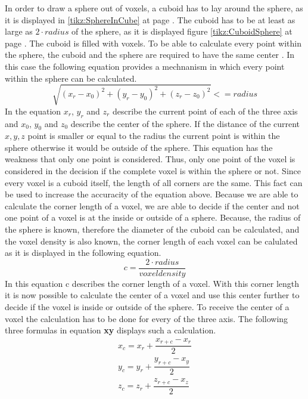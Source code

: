 In order to draw a sphere out of voxels, a cuboid has to lay around the sphere, as it is displayed in \ref{tikz:SphereInCube} at page \pageref{tikz:SphereInCube}. The cuboid has to be at least as large as $2 \cdot radius$ of the sphere, as it is displayed figure \ref{tikz:CuboidSphere} at page \pageref{tikz:CuboidSphere}. The cuboid is filled with voxels. To be able to calculate every point within the sphere, the cuboid and the sphere are required to have the same center \cite{REF}. In this case the following equation provides a mechnanism in which every point within the sphere can be calculated.
\begin{equation}
\sqrt{(x_{r}-x_{0})^2 + (y_{r}-y_{0})^2 + (z_{r}-z_{0})^2} <= radius
\end{equation}
In the equation $x_{r}$, $y_{r}$ and $z_{r}$ describe the current point of each of the three axis and $x_{0}$, $y_{0}$ and $z_{0}$ describe the center of the sphere. If the distance of the current $x, y, z$ point is smaller or equal to the radius the current point is within the sphere otherwise it would be outside of the sphere.
This equation has the weakness that only one point is considered. Thus, only one point of the voxel is considered in the decision if the complete voxel is within the sphere or not.
Since every voxel is a cuboid itself, the length of all corners are the same. This fact can be used to increase the accuracity of the equation above. Because we are able to calculate the corner length of a voxel, we are able to decide if the center and not one point of a voxel is at the inside or outside of a sphere. Because, the radius of the sphere is known, therefore the diameter of the cuboid can be calculated, and the voxel density is also known, the corner length of each voxel can be calulated as it is displayed in the following equation.
\begin{equation}
c = \dfrac{2 \cdot radius}{voxel density}
\end{equation}
In this equation c describes the corner length of a voxel. With this corner length it is now possible to calculate the center of a voxel and use this center further to decide if the voxel is inside or outside of the sphere. To receive the center of a voxel the calculation has to be done for every of the three axis. The following three formulas in equation \textbf{xy} displays such a calculation. 
\begin{equation}
\begin{split}
x_{c} = x_{r} + \dfrac{x_{r+c} - x_{r}}{2} \\
y_{c} = y_{r} + \dfrac{y_{r+c} - x_{y}}{2} \\
z_{c} = z_{r} + \dfrac{z_{r+c} - x_{z}}{2} \\
\end{split}
\end{equation}
